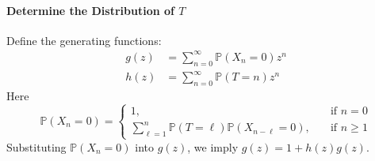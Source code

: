 \paragraph{Determine the Distribution of $T$}
Define the generating functions:
\begin{align*}
g(z)&=\sum_{n=0}^\infty\mathbb{P}(X_n=0)z^n\\
h(z)&=\sum_{n=0}^\infty\mathbb{P}(T=n)z^n
\end{align*}
Here 
\[
\mathbb{P}(X_n=0)=\left\{
\begin{aligned}
1,&\quad\text{if $n=0$}\\
\sum_{\ell=1}^n\mathbb{P}(T=\ell)\mathbb{P}(X_{n-\ell}=0),&\quad\text{if $n\ge1$}
\end{aligned}
\right.
\]
Substituting $\mathbb{P}(X_n=0)$ into $g(z)$, we imply
$g(z) = 1+h(z)g(z)$.


